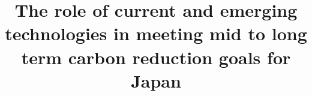 \documentclass[review]{elsarticle}
\begin{document}
\begin{frontmatter}
\title{The role of current and emerging technologies in meeting mid to long term carbon reduction goals for Japan}

\date{}                     %




	
\begin{keyword}

\end{keyword}



\end{frontmatter}
\glsresetall

\linenumbers



\FloatBarrier

\FloatBarrier

\FloatBarrier

\FloatBarrier
%

\FloatBarrier

\FloatBarrier


\newpage
\appendix

\end{document}
